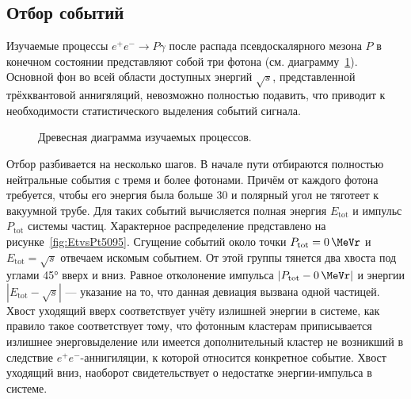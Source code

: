 \subsection{Отбор событий}

Изучаемые процессы $e^+ e^- \to P \gamma$ после распада псевдоскалярного мезона $P$
в конечном состоянии представляют собой три фотона (см. диаграмму~\ref{diag:ee_to_Pg}).
Основной фон во всей области доступных энергий $\sqrt{s}$,
представленной трёхквантовой аннигяляций,
невозможно полностью подавить,
что приводит к необходимости статистического выделения событий сигнала.

\begin{figure}[htbp]
	\centering
	\caption{Древесная диаграмма изучаемых процессов.}\label{diag:ee_to_Pg}
\end{figure}

Отбор разбивается на несколько шагов.
В начале пути отбираются полностью нейтральные события с тремя и более фотонами.
Причём от каждого фотона требуется, чтобы его энергия была больше \SI{30}{\MeVr} и полярный угол не тяготеет к вакуумной трубе.
Для таких событий вычисляется полная энергия $E_{\text{tot}}$ и импульс $P_{\text{tot}}$ системы частиц.
Характерное распределение представлено на рисунке~\ref{fig:EtvsPt5095}.
Сгущение событий около точки $P_{\text{tot}} = \SI{0}{\MeVr}$ и $E_{\text{tot}} = \sqrt{s}$ отвечаем искомым событием.
От этой группы тянется два хвоста под углами \ang{45} вверх и вниз.
Равное отколонение импульса $|P_{\text{tot}} - \SI{0}{\MeVr}|$ и энергии $|E_{\text{tot}} - \sqrt{s}|$
---
указание на то,
что данная девиация вызвана одной частицей.
Хвост уходящий вверх соответствует учёту излишней энергии в системе,
как правило такое соответствует тому,
что фотонным кластерам приписывается излишнее энерговыделение или имеется дополнительный кластер не возникший в следствие $e^+e^-$-аннигиляции,
к которой относится конкретное событие.
Хвост уходящий вниз, наоборот свидетельствует о недостатке энергии-импульса в системе.

